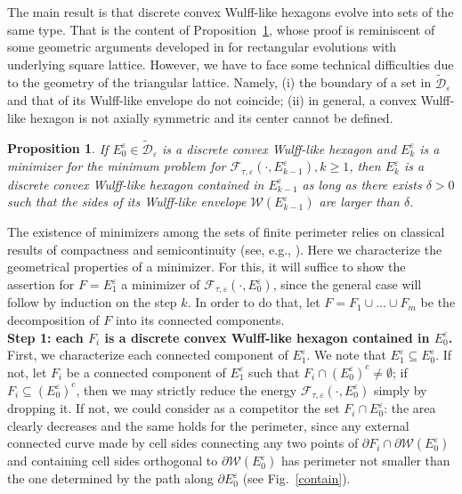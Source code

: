 \documentclass{interact}
\numberwithin{equation}{section}
\newtheorem{prop}[thm]{Proposition}
\theoremstyle{definition}
\newcommand{\D}{\mathcal{D}}
\renewcommand{\epsilon}{\varepsilon}
\def\e{\epsilon}
\begin{document}
The main result is that discrete convex Wulff-like hexagons evolve into sets of the same type. That is the content of Proposition~\ref{rectangleprop}, whose proof is reminiscent of some geometric arguments developed in \cite[Theorem~1]{BGN} for rectangular evolutions with underlying square lattice. However, we have to face some technical difficulties due to the geometry of the triangular lattice. Namely, (i) the boundary of a set in $\widetilde{\mathcal{D}}_\epsilon$ and that of its Wulff-like envelope do not coincide; (ii) in general, a convex Wulff-like hexagon is not axially symmetric and its center cannot be defined.

\begin{prop}\label{rectangleprop}
If $E_0^{\epsilon}\in{\widetilde{\D}}_\epsilon$ is a discrete convex Wulff-like hexagon and $E_k^\epsilon$ is a minimizer for the minimum problem for $\mathcal{F}_{\tau,\epsilon}(\cdot,E_{k-1}^\epsilon), k\geq1$, then %
$E_k^\epsilon$ is a discrete convex Wulff-like hexagon contained in $E_{k-1}^\epsilon$ as long as there exists $\delta>0$ such that the sides of its Wulff-like envelope $\mathcal{W}(E_{k-1}^\epsilon)$ are larger than $\delta$. %
\end{prop}

\proof
The existence of minimizers among the sets of finite perimeter relies on classical results of compactness and semicontinuity (see, e.g., \cite[Section~3.2]{ATW83}). Here we characterize the geometrical properties of a minimizer. For this, it will suffice to show the assertion for $F=E^\epsilon_1$ a minimizer of $\mathcal{F}_{\tau,\epsilon}(\cdot,E_{0}^\epsilon)$, since the general case will follow by induction on the step $k$. In order to do that, let $F=F_1\cup\dots\cup F_m$ be the decomposition of $F$ into its connected components.
\\
{\bf Step 1: each $F_i$ is a discrete convex Wulff-like hexagon contained in $E^\epsilon_0$.} First, we characterize each connected component of $E^\epsilon_1$. We note that $E^\epsilon_1\subseteq E^\epsilon_0$. If not, let $F_i$ be a connected component of $E^\epsilon_1$ such that $F_i\cap(E^\epsilon_0)^c\neq\emptyset$; if $F_i\subseteq (E^\epsilon_0)^c$, then we may strictly reduce the energy $\mathcal{F}_{\tau,\epsilon}(\cdot, E^\epsilon_0)$ simply by dropping it. If not, we could consider as a competitor the set $F_i\cap E^\epsilon_0$: the area clearly decreases and the same holds for the perimeter, since any external connected curve made by cell sides connecting any two points of $\partial F_i\cap\partial \mathcal{W}(E^\epsilon_0)$ and containing cell sides orthogonal to $\partial\mathcal{W}(E^\epsilon_0)$ has perimeter not smaller than the one determined by the path along $\partial E^\epsilon_0$ (see Fig.~\ref{contain}). 
\end{document}
